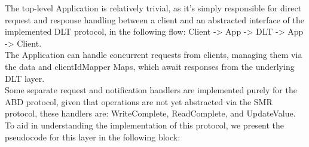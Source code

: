\documentclass[sigconf]{acmart}
\begin{document}
The top-level Application is relatively trivial, as it's simply responsible for direct request and response handling between a client and an abstracted interface of the implemented DLT protocol, in the following flow: Client -> App -> DLT -> App -> Client. \\
The Application can handle concurrent requests from clients, managing them via the data and clientIdMapper Maps, which await responses from the underlying DLT layer. \\
Some separate request and notification handlers are implemented purely for the ABD protocol, given that operations are not yet abstracted via the SMR protocol, these handlers are: WriteComplete, ReadComplete, and UpdateValue. \\ 
To aid in understanding the implementation of this protocol, we present the pseudocode for this layer in the following block: \\
\end{document}
